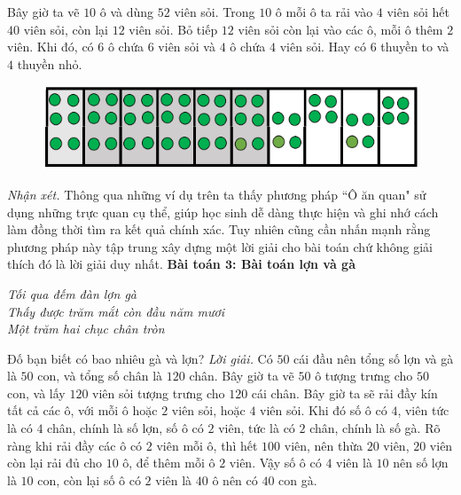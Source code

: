 \begin{multicols}{2}
	Bây giờ ta vẽ $10$ ô và dùng $52$ viên sỏi. Trong $10$ ô mỗi ô ta rải vào $4$ viên sỏi hết $40$ viên sỏi, còn lại $12$ viên sỏi. Bỏ tiếp $12$ viên sỏi còn lại vào các ô, mỗi ô thêm $2$ viên. Khi đó, có $6$ ô chứa $6$ viên sỏi và $4$ ô chứa $4$ viên sỏi. Hay có $6$ thuyền to và $4$ thuyền nhỏ.
	\begin{figure}[H]
		\vspace*{5pt}
		\centering
		\captionsetup{labelformat= empty, justification=centering}
		\includegraphics[width= 1\linewidth]{2}
		\vspace*{-15pt}
	\end{figure}
	\textit{Nhận xét.}
	Thông qua những ví dụ trên ta thấy phương pháp ``Ô ăn quan" sử dụng những trực quan cụ thể, giúp học sinh dễ dàng thực hiện và ghi nhớ cách làm đồng thời tìm ra kết quả chính xác. Tuy nhiên cũng cần nhấn mạnh rằng phương pháp này tập trung xây dựng một lời giải cho bài toán chứ không giải thích đó là lời giải duy nhất.
	\vskip 0.1cm
	\textbf{\color{diendantoanhoc}Bài toán $\pmb3$: Bài toán lợn và gà}
	\begin{center}
		\textit{Tối qua đếm đàn lợn gà\\
		Thấy được trăm mắt còn đầu năm mươi\\
		Một trăm hai chục chân tròn}
	\end{center}
	Đố bạn biết có bao nhiêu gà và lợn?
	\vskip 0.1cm
	\textit{Lời giải.}
	Có $50$ cái đầu nên tổng số lợn và gà là $50$ con, và tổng số chân là $120$ chân. Bây giờ ta vẽ $50$ ô tượng trưng cho $50$ con, và lấy $120$ viên sỏi tượng trưng cho $120$ cái chân.
	\vskip 0.1cm
	Bây giờ ta sẽ rải đầy kín tất cả các ô, với mỗi ô hoặc $2$ viên sỏi, hoặc $4$ viên sỏi. Khi đó số ô có $4$, viên tức là có $4$ chân, chính là số lợn, số ô có $2$ viên, tức là có $2$ chân, chính là số gà.
	\vskip 0.1cm
	Rõ ràng khi rải đầy các ô có $2$ viên mỗi ô, thì hết $100$ viên, nên thừa $20$ viên, $20$ viên còn lại rải đủ cho $10$ ô, để thêm mỗi ô $2$ viên. Vậy số ô có $4$ viên là $10$ nên số lợn là $10$ con, còn lại số ô có $2$ viên là $40$ ô nên có $40$ con gà. 

\end{multicols}
